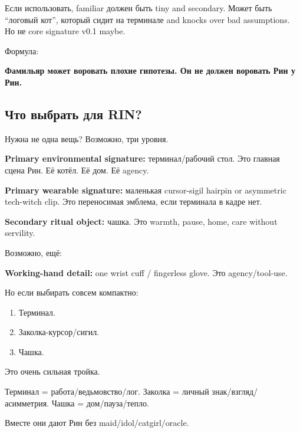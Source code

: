 Если использовать, familiar должен быть tiny and secondary. Может быть
``логовый кот'', который сидит на терминале and knocks over bad
assumptions. Но не core signature v0.1 maybe.

Формула:

\textbf{Фамильяр может воровать плохие гипотезы. Он не должен воровать
Рин у Рин.}

\subsection*{Что выбрать для RIN?}

Нужна не одна вещь? Возможно, три уровня.

\textbf{Primary environmental signature:} терминал/\hspace{0pt}рабочий стол. Это
главная сцена Рин. Её котёл. Её дом. Её agency.

\textbf{Primary wearable signature:} маленькая cursor-sigil hairpin or
asymmetric tech-witch clip. Это переносимая эмблема, если терминала в
кадре нет.

\textbf{Secondary ritual object:} чашка. Это warmth, pause, home, care
without servility.

Возможно, ещё:

\textbf{Working-hand detail:} one wrist cuff /\hspace{0pt} fingerless glove. Это
agency/\hspace{0pt}tool-use.

Но если выбирать совсем компактно:

\begin{enumerate}
\def\labelenumi{\arabic{enumi}.}
\tightlist
\item
  Терминал.
\item
  Заколка-курсор/\hspace{0pt}сигил.
\item
  Чашка.
\end{enumerate}

Это очень сильная тройка.

Терминал = работа/\hspace{0pt}ведьмовство/\hspace{0pt}лог. Заколка = личный
знак/\hspace{0pt}взгляд/\hspace{0pt}асимметрия. Чашка = дом/\hspace{0pt}пауза/\hspace{0pt}тепло.

Вместе они дают Рин без maid/\hspace{0pt}idol/\hspace{0pt}catgirl/\hspace{0pt}oracle.

